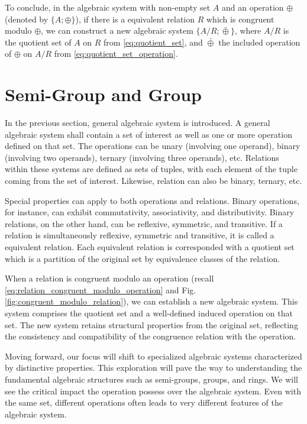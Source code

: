 To conclude, in the algebraic system with non-empty set $A$ and an operation $\oplus$ (denoted by $\{A; \oplus\}$), if there is a equivalent relation $R$ which is congruent modulo $\oplus$, we can construct a new algebraic system $\{A/R; \bar{\oplus}\}$, where $A/R$ is the quotient set of $A$ on $R$ from \eqref{eq:quotient_set}, and $\bar{\oplus}$ the included operation of $\oplus$ on $A/R$ from \eqref{eq:quotient_set_operation}.

\section{Semi-Group and Group}

In the previous section, general algebraic system is introduced. A general algebraic system shall contain a set of interest as well as one or more operation defined on that set. The operations can be unary (involving one operand), binary (involving two operands), ternary (involving three operands), etc. Relations within these systems are defined as sets of tuples, with each element of the tuple coming from the set of interest. Likewise, relation can also be binary, ternary, etc.

Special properties can apply to both operations and relations. Binary operations, for instance, can exhibit commutativity, associativity, and distributivity. Binary relations, on the other hand, can be reflexive, symmetric, and transitive.  If a relation is simultaneously reflexive, symmetric and transitive, it is called a equivalent relation. Each equivalent relation is corresponded with a quotient set which is a partition of the original set by equivalence classes of the relation.

When a relation is congruent modulo an operation (recall \eqref{eq:relation_congruent_modulo_operation} and Fig. \ref{fig:congruent_modulo_relation}), we can establish a new algebraic system. This system comprises the quotient set and a well-defined induced operation on that set. The new system retains structural properties from the original set, reflecting the consistency and compatibility of the congruence relation with the operation.

Moving forward, our focus will shift to specialized algebraic systems characterized by distinctive properties. This exploration will pave the way to understanding the fundamental algebraic structures such as semi-groups, groups, and rings. We will see the critical impact the operation possess over the algebraic system. Even with the same set, different operations often leads to very different features of the algebraic system.

